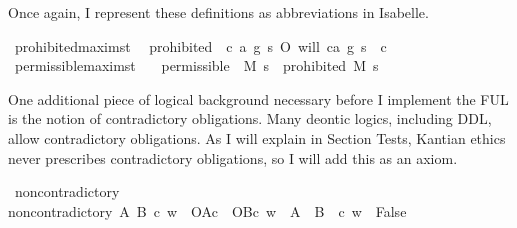 \begin{isabellebody}
\begin{isamarkuptext}
Once again, I represent these definitions as abbreviations in Isabelle.%
\end{isamarkuptext}\isamarkuptrue%
\isamarkupfalse%
\ prohibited{\isacharcolon}{\isacharcolon}{\isachardoublequoteopen}maxim{\isasymRightarrow}s{\isasymRightarrow}t{\isachardoublequoteclose}\ \ \isanewline
{\isachardoublequoteopen}prohibited\ {\isasymequiv}\ {\isasymlambda}{\isacharparenleft}c{\isacharcomma}\ a{\isacharcomma}\ g{\isacharparenright}\ s{\isachardot}\ O{\isacharbraceleft}\isactrlbold {\isasymnot}\ {\isacharparenleft}will\ {\isacharparenleft}c{\isacharcomma}a{\isacharcomma}\ g{\isacharparenright}\ s{\isacharparenright}\ {\isacharbar}\ c{\isacharbraceright}{\isachardoublequoteclose}\isanewline
%
\isanewline
\isanewline
{}\isamarkupfalse%
\ permissible{\isacharcolon}{\isacharcolon}{\isachardoublequoteopen}maxim{\isasymRightarrow}s{\isasymRightarrow}t{\isachardoublequoteclose}\isanewline
\ \ \ {\isachardoublequoteopen}permissible\ {\isasymequiv}\ {\isasymlambda}M\ s{\isachardot}\ \isactrlbold {\isasymnot}\ {\isacharparenleft}prohibited\ M\ s{\isacharparenright}{\isachardoublequoteclose}\isanewline
%
%
\begin{isamarkuptext}%
One additional piece of logical background necessary before I implement the FUL is the 
notion of contradictory obligations. Many deontic logics, including DDL, allow contradictory
obligations. As I will explain in Section Tests, Kantian ethics never prescribes contradictory
obligations, so I will add this as an axiom.%
\end{isamarkuptext}\isamarkuptrue%
\isamarkupfalse%
\ non{\isacharunderscore}contradictory\ \ \isanewline
{\isachardoublequoteopen}non{\isacharunderscore}contradictory\ A\ B\ c\ w\ {\isasymequiv}\ {\isacharparenleft}{\isacharparenleft}O{\isacharbraceleft}A{\isacharbar}c{\isacharbraceright}\ \isactrlbold {\isasymand}\ O{\isacharbraceleft}B{\isacharbar}c{\isacharbraceright}{\isacharparenright}\ w{\isacharparenright}\ {\isasymlongrightarrow}\ {\isasymnot}{\isacharparenleft}{\isacharparenleft}A\ \isactrlbold {\isasymand}\ {\isacharparenleft}B\ \isactrlbold {\isasymand}\ c{\isacharparenright}{\isacharparenright}\ w\ {\isasymlongrightarrow}\ False{\isacharparenright}{\isachardoublequoteclose}\isanewline

\end{isabellebody}

